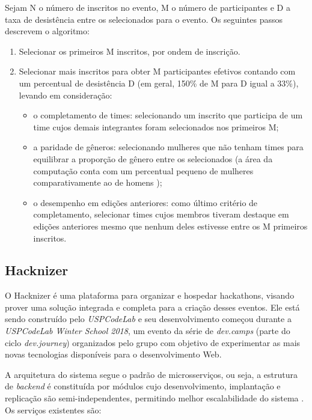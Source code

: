 \documentclass[10pt,twoside,a4paper]{article}
\begin{document}
    
Sejam N o número de inscritos no evento, M o número de participantes e D a taxa de desistência entre os selecionados para o evento. Os seguintes passos descrevem o algoritmo:
    
    \begin{enumerate}
      \item Selecionar os primeiros M inscritos, por ondem de inscrição.
     
      \item Selecionar mais inscritos para obter M participantes efetivos contando com um percentual de desistência D (em geral, 150\% de M para D igual a 33\%), levando em consideração: 
      
      \begin{itemize}
          \item o completamento de times: selecionando um inscrito que participa de um time cujos demais integrantes foram selecionados nos primeiros M;
          \item a paridade de gêneros: selecionando mulheres que não tenham times para equilibrar a proporção de gênero entre os selecionados (a área da computação conta com um percentual pequeno de mulheres comparativamente ao de homens \cite{Frenkel1990WomenComputing});
          \item o desempenho em edições anteriores: como último critério de completamento, selecionar times cujos membros tiveram destaque em edições anteriores mesmo que nenhum deles estivesse entre os M primeiros inscritos.
      \end{itemize}   
    \end{enumerate}
    
  \subsection{Hacknizer}

    O Hacknizer é uma plataforma para organizar e hospedar hackathons, visando prover uma solução integrada e completa para a criação desses eventos. Ele está sendo construído pelo \textit{USPCodeLab} e seu desenvolvimento começou durante a \textit{USPCodeLab Winter School 2018}, um evento da série de \textit{dev.camps} (parte do ciclo \textit{dev.journey}) organizados pelo grupo com objetivo de experimentar as mais novas tecnologias disponíveis para o desenvolvimento Web.
    
    A arquitetura do sistema segue o padrão de microsserviços, ou seja, a estrutura de \textit{backend} é constituída por módulos cujo desenvolvimento, implantação e replicação são semi-independentes, permitindo melhor escalabilidade do sistema \cite{Newman2015BuildingSystems}. Os serviços existentes são:
    
\end{document}

